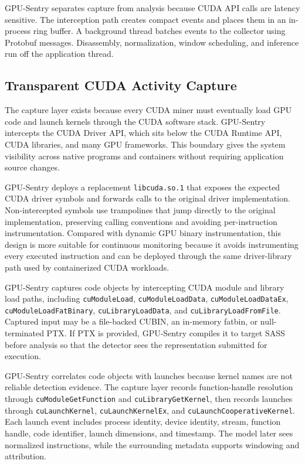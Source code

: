GPU-Sentry separates capture from analysis because CUDA API calls are latency sensitive. The interception path creates compact events and places them in an in-process ring buffer. A background thread batches events to the collector using Protobuf messages. Disassembly, normalization, window scheduling, and inference run off the application thread.

\subsection{Transparent CUDA Activity Capture}
\label{sec:capture}

The capture layer exists because every CUDA miner must eventually load GPU code and launch kernels through the CUDA software stack. GPU-Sentry intercepts the CUDA Driver API, which sits below the CUDA Runtime API, CUDA libraries, and many GPU frameworks. This boundary gives the system visibility across native programs and containers without requiring application source changes.

GPU-Sentry deploys a replacement \texttt{libcuda.so.1} that exposes the expected CUDA driver symbols and forwards calls to the original driver implementation. Non-intercepted symbols use trampolines that jump directly to the original implementation, preserving calling conventions and avoiding per-instruction instrumentation. Compared with dynamic GPU binary instrumentation, this design is more suitable for continuous monitoring because it avoids instrumenting every executed instruction and can be deployed through the same driver-library path used by containerized CUDA workloads.

GPU-Sentry captures code objects by intercepting CUDA module and library load paths, including \texttt{cuModuleLoad}, \texttt{cuModuleLoadData}, \texttt{cuModuleLoadDataEx}, \texttt{cuModuleLoadFatBinary}, \texttt{cuLibraryLoadData}, and \texttt{cuLibraryLoadFromFile}. Captured input may be a file-backed CUBIN, an in-memory fatbin, or null-terminated PTX. If PTX is provided, GPU-Sentry compiles it to target SASS before analysis so that the detector sees the representation submitted for execution.

GPU-Sentry correlates code objects with launches because kernel names are not reliable detection evidence. The capture layer records function-handle resolution through \texttt{cuModuleGetFunction} and \texttt{cuLibraryGetKernel}, then records launches through \texttt{cuLaunchKernel}, \texttt{cuLaunchKernelEx}, and \texttt{cuLaunchCooperativeKernel}. Each launch event includes process identity, device identity, stream, function handle, code identifier, launch dimensions, and timestamp. The model later sees normalized instructions, while the surrounding metadata supports windowing and attribution.

